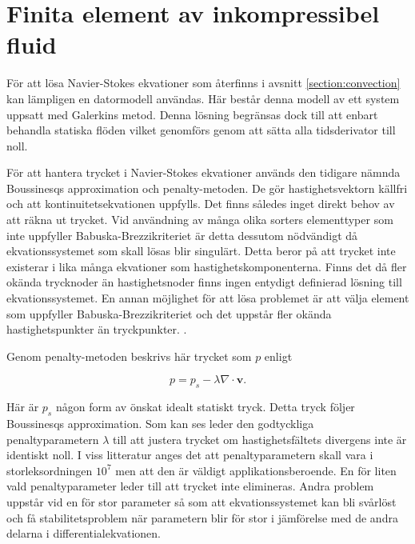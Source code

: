\section{Finita element av inkompressibel fluid}
\label{sec:femconvection}
För att lösa Navier-Stokes ekvationer som återfinns i avsnitt
\ref{section:convection} kan lämpligen en datormodell användas.
Här består denna modell av ett system uppsatt med Galerkins metod.
Denna lösning begränsas dock till att enbart behandla statiska flöden
vilket genomförs genom att sätta alla tidsderivator till noll.

För att hantera trycket i Navier-Stokes ekvationer
används den tidigare nämnda Boussinesqs approximation
och penalty-metoden. De gör hastighetsvektorn källfri och att
kontinuitetsekvationen uppfylls. Det finns således inget direkt behov av att räkna ut trycket.
Vid användning av många olika sorters elementtyper som inte uppfyller Babuska-Brezzikriteriet
är detta dessutom nödvändigt då ekvationssystemet som skall lösas blir singulärt. 
Detta beror på att trycket inte existerar i lika många ekvationer som hastighetskomponenterna.
Finns det då fler okända trycknoder än hastighetsnoder finns ingen entydigt definierad lösning
till ekvationssystemet. En annan möjlighet för att lösa problemet är att välja element som
uppfyller Babuska-Brezzikriteriet och det uppstår fler okända hastighetspunkter än tryckpunkter. \emph{}.
\cite{babuska1973}\cite{segal2011}

Genom penalty-metoden beskrivs här trycket som $p$ enligt 

\begin{equation}
\label{eq:femconvection:penalty}
p = p_s - \lambda\nabla\cdot\mathbf{v}.
\end{equation}

Här är $p_s$ någon form av önskat idealt statiskt
tryck. Detta tryck följer Boussinesqs approximation.
\cite{heinrich88}\cite{taylor79}
Som kan ses leder den godtyckliga penaltyparametern $\lambda$ till att justera trycket
om hastighetsfältets divergens inte är identiskt noll. I viss litteratur anges 
det att penaltyparametern skall vara i storleksordningen $10^7$ men att den
är väldigt applikationsberoende. En för liten vald penaltyparameter leder till att
trycket inte elimineras. Andra problem uppstår vid en för stor parameter så som att ekvationssystemet
kan bli svårlöst och få stabilitetsproblem när parametern blir
för stor i jämförelse med de andra delarna i differentialekvationen.\cite{reddy93}\cite{roy05}\cite{basak04}\cite{segal2011}

